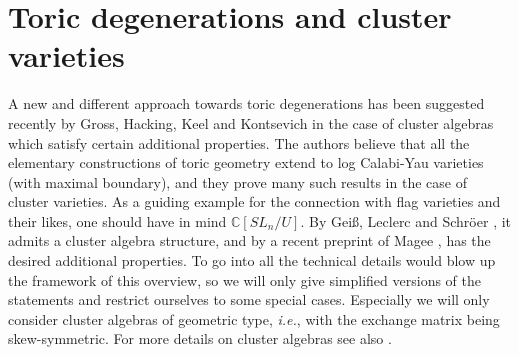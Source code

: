 \documentclass{emsprocart}
\theoremstyle{definition}
\begin{document}
\section{Toric degenerations and cluster varieties}\label{cluster}
 A new and  different approach towards toric degenerations has been suggested recently by 
Gross, Hacking, Keel and Kontsevich \cite{GHKK} in the case of cluster algebras which satisfy certain additional properties. 
The authors believe that all the elementary constructions of toric geometry extend to log Calabi-Yau varieties (with
maximal boundary), and they prove many such results in the case of cluster varieties. 
As a guiding example for the connection with flag varieties and their likes, one should have in mind $\mathbb C[SL_n/U]$.
By Gei\ss, Leclerc and Schr\"oer \cite{GLS},  it admits a cluster algebra structure, and by a recent 
preprint of Magee \cite{M}, has the desired additional properties. 
To go into all the technical details would blow up the framework of this overview, so we will only give simplified versions 
of the statements and restrict ourselves to some special cases. Especially we will only consider cluster algebras of geometric type, \emph{i.e.}, with the exchange matrix being skew-symmetric. For more details on cluster algebras see also \cite{FZ,GLS,Z}.
\end{document}
